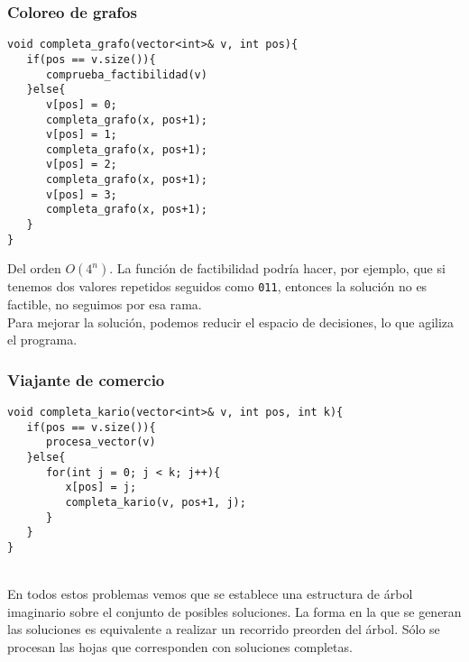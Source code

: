 \subsubsection{Coloreo de grafos}
\begin{verbatim}
void completa_grafo(vector<int>& v, int pos){
   if(pos == v.size()){
      comprueba_factibilidad(v)
   }else{
      v[pos] = 0;
      completa_grafo(x, pos+1);
      v[pos] = 1;
      completa_grafo(x, pos+1);
      v[pos] = 2;
      completa_grafo(x, pos+1);
      v[pos] = 3;
      completa_grafo(x, pos+1);
   }
}
\end{verbatim}
Del orden $O(4^n)$. La función de factibilidad podría hacer, por ejemplo, que si tenemos dos valores repetidos seguidos como \verb|011|, entonces la solución no es factible, no seguimos por esa rama.\\

Para mejorar la solución, podemos reducir el espacio de decisiones, lo que agiliza el programa.

\subsubsection{Viajante de comercio}
\begin{verbatim}
void completa_kario(vector<int>& v, int pos, int k){
   if(pos == v.size()){
      procesa_vector(v)
   }else{
      for(int j = 0; j < k; j++){
         x[pos] = j;
         completa_kario(v, pos+1, j);
      }
   }
}
\end{verbatim}~\\

En todos estos problemas vemos que se establece una estructura de árbol imaginario sobre el conjunto de posibles soluciones. La forma en la que se generan las soluciones es equivalente a realizar un recorrido preorden del árbol. Sólo se procesan las hojas que corresponden con soluciones completas.


